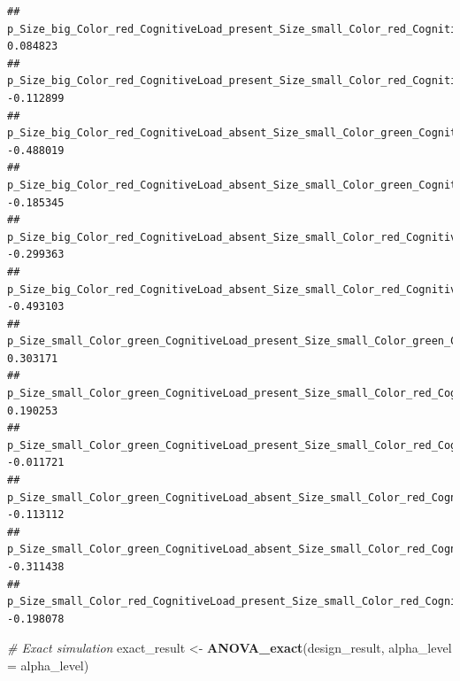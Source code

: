 \documentclass[]{book}
\newenvironment{Shaded}{\begin{snugshade}}{\end{snugshade}}
\newcommand{\CommentTok}[1]{\textcolor[rgb]{0.56,0.35,0.01}{\textit{#1}}}
\newcommand{\DataTypeTok}[1]{\textcolor[rgb]{0.13,0.29,0.53}{#1}}
\newcommand{\KeywordTok}[1]{\textcolor[rgb]{0.13,0.29,0.53}{\textbf{#1}}}
\newcommand{\NormalTok}[1]{#1}
\newcommand{\StringTok}[1]{\textcolor[rgb]{0.31,0.60,0.02}{#1}}
\begin{document}
\begin{verbatim}
## p_Size_big_Color_red_CognitiveLoad_present_Size_small_Color_red_CognitiveLoad_present         0.084823
## p_Size_big_Color_red_CognitiveLoad_present_Size_small_Color_red_CognitiveLoad_absent         -0.112899
## p_Size_big_Color_red_CognitiveLoad_absent_Size_small_Color_green_CognitiveLoad_present       -0.488019
## p_Size_big_Color_red_CognitiveLoad_absent_Size_small_Color_green_CognitiveLoad_absent        -0.185345
## p_Size_big_Color_red_CognitiveLoad_absent_Size_small_Color_red_CognitiveLoad_present         -0.299363
## p_Size_big_Color_red_CognitiveLoad_absent_Size_small_Color_red_CognitiveLoad_absent          -0.493103
## p_Size_small_Color_green_CognitiveLoad_present_Size_small_Color_green_CognitiveLoad_absent    0.303171
## p_Size_small_Color_green_CognitiveLoad_present_Size_small_Color_red_CognitiveLoad_present     0.190253
## p_Size_small_Color_green_CognitiveLoad_present_Size_small_Color_red_CognitiveLoad_absent     -0.011721
## p_Size_small_Color_green_CognitiveLoad_absent_Size_small_Color_red_CognitiveLoad_present     -0.113112
## p_Size_small_Color_green_CognitiveLoad_absent_Size_small_Color_red_CognitiveLoad_absent      -0.311438
## p_Size_small_Color_red_CognitiveLoad_present_Size_small_Color_red_CognitiveLoad_absent       -0.198078
\end{verbatim}

\begin{Shaded}
\begin{Highlighting}[]
\CommentTok{# Exact simulation}
\NormalTok{exact_result <-}\StringTok{ }\KeywordTok{ANOVA_exact}\NormalTok{(design_result, }\DataTypeTok{alpha_level =}\NormalTok{ alpha_level)}
\end{Highlighting}
\end{Shaded}
\end{document}
